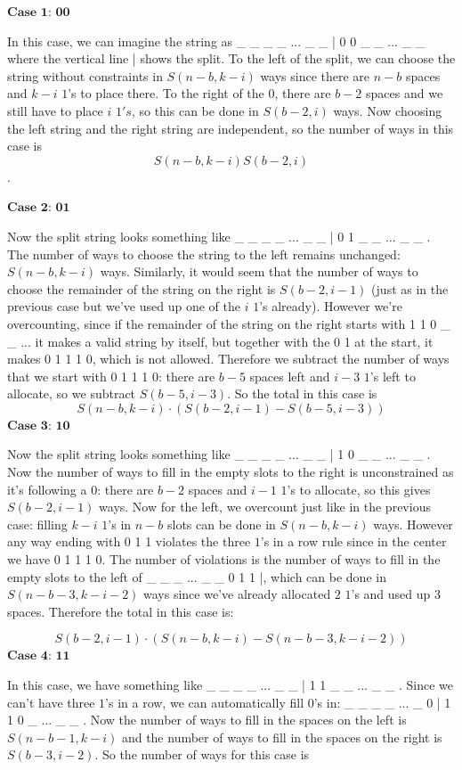 \begin{enumerate}
 $\textbf{Case 1: 00}$

 In this case, we can imagine the string as \_ \_ \_ \_ ... \_ \_ | 0 0 \_ \_ ... \_ \_ where the vertical line | shows the split. To the left of the split, we can choose the string without constraints in $S(n-b, k-i)$ ways since there are $n-b$ spaces and $k-i$ $1$'s to place there. To the right of the $0$, there are $b-2$ spaces and we still have to place $i$ $1's$, so this can be done in $S(b-2,i)$ ways. Now choosing the left string and the right string are independent, so the number of ways in this case is 
 \[S(n-b, k-i)S(b-2, i)\].

 $\textbf{Case 2: 01}$

 Now the split string looks something like \_ \_ \_ \_ ... \_ \_ | 0 1 \_ \_ ... \_ \_ . The number of ways to choose the string to the left remains unchanged: $S(n-b, k-i)$ ways. Similarly, it would seem that the number of ways to choose the remainder of the string on the right is $S(b-2, i-1)$ (just as in the previous case but we've used up one of the $i$ $1$'s already). However we're overcounting, since if the remainder of the string on the right starts with 1 1 0 \_ \_ ... it makes a valid string by itself, but together with the 0 1 at the start, it makes 0 1 1 1 0, which is not allowed. Therefore we subtract the number of ways that we start with 0 1 1 1 0: there are $b-5$ spaces left and $i-3$ $1$'s left to allocate, so we subtract $S(b-5, i-3)$. So the total in this case is 
 \[S(n-b,k-i) \cdot (S(b-2, i-1)-S(b-5, i-3))\]
$\textbf{Case 3: 10}$

 Now the split string looks something like \_ \_ \_ \_ ... \_ \_ | 1 0 \_ \_ ... \_ \_ . Now the number of ways to fill in the empty slots to the right is unconstrained as it's following a $0$: there are $b-2$ spaces and $i-1$ $1$'s to allocate, so this gives $S(b-2, i-1)$ ways. Now for the left, we overcount just like in the previous case: filling $k-i$ $1$'s in $n-b$ slots can be done in $S(n-b, k-i)$ ways. However any way ending with 0 1 1 violates the three $1$'s in a row rule since in the center we have 0 1 1 1 0. The number of violations is the number of ways to fill in the empty slots to the left of \_ \_ \_ ... \_ \_ 0 1 1 |, which can be done in $S(n-b-3, k-i-2)$ ways since we've already allocated $2$ $1$'s and used up $3$ spaces. Therefore the total in this case is:

 
 \[S(b-2, i-1) \cdot (S(n-b, k-i)-S(n-b-3, k-i-2))\]
$\textbf{Case 4: 11}$

 In this case, we have something like \_ \_ \_ \_ ... \_ \_ | 1 1 \_ \_ ... \_ \_ . Since we can't have three $1$'s in a row, we can automatically fill $0$'s in: \_ \_ \_ \_ ... \_ 0 | 1 1 0 \_ ... \_ \_ . Now the number of ways to fill in the spaces on the left is $S(n-b-1, k-i)$ and the number of ways to fill in the spaces on the right is $S(b-3, i-2)$. So the number of ways for this case is


\end{enumerate}

